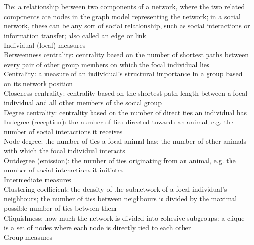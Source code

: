 Tie: a relationship between two components of a network,
where the two related components are nodes in the graph
model representing the network; in a social network, these
can be any sort of social relationship, such as social interactions
or information transfer; also called an edge or link\\

Individual (local) measures\\

Betweenness centrality: centrality based on the number of
shortest paths between every pair of other group members
on which the focal individual lies\\

Centrality: a measure of an individual’s structural importance
in a group based on its network position\\

Closeness centrality: centrality based on the shortest path
length between a focal individual and all other members of
the social group\\

Degree centrality: centrality based on the number of direct
ties an individual has\\

Indegree (reception): the number of ties directed towards
an animal, e.g. the number of social interactions it receives\\

Node degree: the number of ties a focal animal has; the
number of other animals with which the focal individual
interacts\\

Outdegree (emission): the number of ties originating from
an animal, e.g. the number of social interactions it initiates\\

Intermediate measures\\

Clustering coefficient: the density of the subnetwork of a focal
individual’s neighbours; the number of ties between
neighbours is divided by the maximal possible number of
ties between them\\

Cliquishness: how much the network is divided into cohesive
subgroups; a clique is a set of nodes where each node
is directly tied to each other\\

Group measures\\

